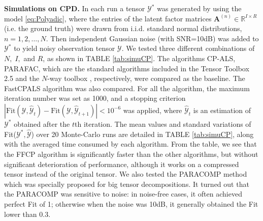 \documentclass[10pt,twocolumn,twoside]{IEEEtran}
\newcommand{\tensor}[1]{\ensuremath{\boldsymbol{\mathscr{#1}}}}
\newcommand{\matn}[2][n]{\ensuremath{\mathbf{#2}^{(#1)}}}
\newcommand{\Real}{\ensuremath{\mathbb{R}}}
\begin{document}
{\bf Simulations on CPD.} In each run a tensor $\tensor{Y}^*$ was generated by using the model \eqref{eq:Polyadic}, where the entries of the latent factor matrices $\matn{A}\in\Real^{I\times R}$ (i.e. the ground truth) were drawn from i.i.d. standard normal distributions, $n=1,2,\ldots,N$. Then independent Gaussian noise (with SNR=10dB) was added to $\tensor{Y}^*$ to yield noisy observation tensor \tensor{Y}.  We tested three different combinations of $N,\; I,$ and $R$, as shown in TABLE \ref{tab:simuCP}. The algorithms CP-ALS, PARAFAC, which are the standard algorithms included in the Tensor Toolbox 2.5 \cite{KoldaTensorToolbox} and the $N$-way toolbox \cite{nwaytoolbox}, respectively, were compared as the baseline. The FastCPALS algorithm  \cite{PhanCPgrad} was also compared. For all the algorithm, the maximum iteration number was set as 1000, and a stopping criterion $|\text{Fit}(\tensor{Y},\tensor{\hat{Y}}_t)-\text{Fit}(\tensor{Y},\tensor{\hat{Y}}_{t+1})|<10^{-6}$ was applied, where  $\tensor{\hat{Y}}_t$ is an estimation of $\tensor{Y}^*$ obtained after the $t$th iteration. The mean values and standard variations of Fit($\tensor{Y}^*,\tensor{\hat{Y}}$) over 20 Monte-Carlo runs are detailed in TABLE \ref{tab:simuCP}, along with the averaged time consumed by each algorithm. From the table, we see that the FFCP algorithm is significantly faster than the other algorithms, but without  significant deterioration of performance, although it works on a compressed tensor instead of the original tensor.  We also tested the PARACOMP \cite{paracomp} method which was specially proposed for big tensor decompositions. It turned out that the PARACOMP was sensitive to noise: in noise-free cases, it often achieved perfect Fit of 1; otherwise when the noise was 10dB, it generally obtained the Fit lower than 0.3.
\end{document}
